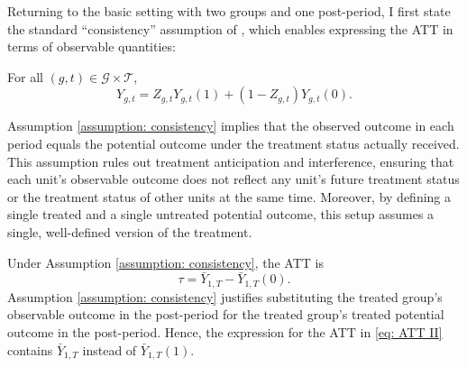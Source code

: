 \documentclass[twoside,11pt]{article}
\begin{document}
Returning to the basic setting with two groups and one post-period, I first state the standard ``consistency'' assumption of \citet{hernanrobins2020}, which enables expressing the \textrm{ATT} in terms of observable quantities:
\begin{assumption} \label{assumption: consistency}
For all $(g,t) \in \mathcal{G} \times \mathcal{T}$,
\begin{equation} \label{eq: consistency}
Y_{g,t} = Z_{g,t} Y_{g,t}(1) + \left(1 - Z_{g,t}\right)Y_{g,t}(0).
\end{equation}
\end{assumption}
\noindent Assumption \ref{assumption: consistency} implies that the observed outcome in each period equals the potential outcome under the treatment status actually received. This assumption rules out treatment anticipation and interference, ensuring that each unit's observable outcome does not reflect any unit's future treatment status or the treatment status of other units at the same time. Moreover, by defining a single treated and a single untreated potential outcome, this setup assumes a single, well-defined version of the treatment.

Under Assumption \ref{assumption: consistency}, the \textrm{ATT} is
\begin{equation}\label{eq: ATT II}
\tau = \bar{Y}_{1,T} - \bar{Y}_{1,T}(0).
\end{equation}
Assumption \ref{assumption: consistency} justifies substituting the treated group's observable outcome in the post-period for the treated group's treated potential outcome in the post-period. Hence, the expression for the \textrm{ATT} in \eqref{eq: ATT II} contains $\bar{Y}_{1,T}$ instead of $\bar{Y}_{1,T}(1)$.
\end{document}
